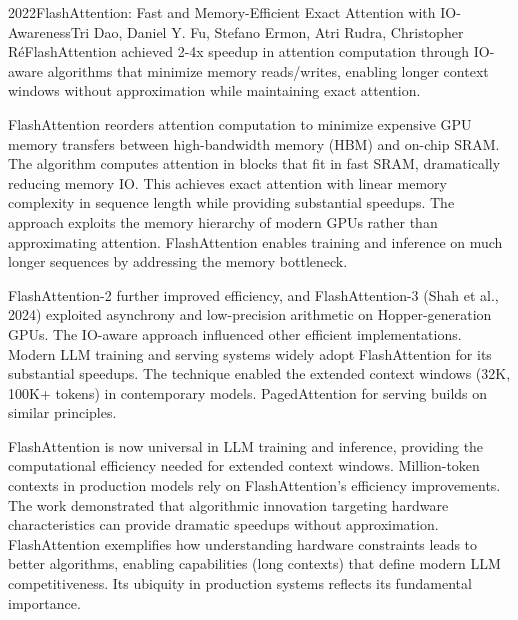 
\begin{papersummary}{2022}{FlashAttention: Fast and Memory-Efficient Exact Attention with IO-Awareness}{Tri Dao, Daniel Y. Fu, Stefano Ermon, Atri Rudra, Christopher Ré}{FlashAttention achieved 2-4x speedup in attention computation through IO-aware algorithms that minimize memory reads/writes, enabling longer context windows without approximation while maintaining exact attention.}

FlashAttention reorders attention computation to minimize expensive GPU memory transfers between high-bandwidth memory (HBM) and on-chip SRAM. The algorithm computes attention in blocks that fit in fast SRAM, dramatically reducing memory IO. This achieves exact attention with linear memory complexity in sequence length while providing substantial speedups. The approach exploits the memory hierarchy of modern GPUs rather than approximating attention. FlashAttention enables training and inference on much longer sequences by addressing the memory bottleneck.

FlashAttention-2 further improved efficiency, and FlashAttention-3 (Shah et al., 2024) exploited asynchrony and low-precision arithmetic on Hopper-generation GPUs. The IO-aware approach influenced other efficient implementations. Modern LLM training and serving systems widely adopt FlashAttention for its substantial speedups. The technique enabled the extended context windows (32K, 100K+ tokens) in contemporary models. PagedAttention for serving builds on similar principles.

FlashAttention is now universal in LLM training and inference, providing the computational efficiency needed for extended context windows. Million-token contexts in production models rely on FlashAttention's efficiency improvements. The work demonstrated that algorithmic innovation targeting hardware characteristics can provide dramatic speedups without approximation. FlashAttention exemplifies how understanding hardware constraints leads to better algorithms, enabling capabilities (long contexts) that define modern LLM competitiveness. Its ubiquity in production systems reflects its fundamental importance.

\end{papersummary}
